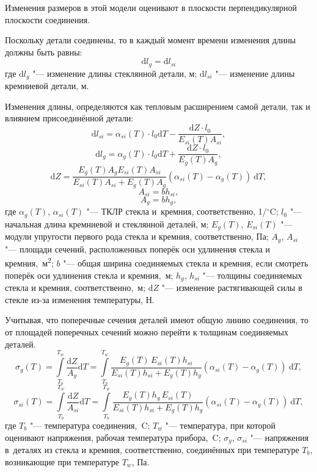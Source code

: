 Изменения размеров в этой модели оценивают в плоскости перпендикулярной плоскости
соединения.

Поскольку детали соединены, то в каждый момент времени изменения длины должны быть равны:
\begin{equation*}
    \mathrm{d}l_g=\mathrm{d}l_{si}
\end{equation*}
где  $ \mathrm{d}l_g $ "--- изменение длины стеклянной детали, м;
$ \mathrm{d}l_{si} $ "--- изменение длины кремниевой детали, м.

Изменения длины, определяются как тепловым расширением самой детали, так и влиянием присоединённой детали:
\[
    \mathrm{d}l_{si}
    =
    \alpha_{si}(T) \cdot l_0 \mathrm{d}T
    -
    \frac{\mathrm{d}Z \cdot l_0}{E_{si} (T) A_{si}},
\]
\[
    \mathrm{d}l_g
    =
    \alpha_g(T) \cdot l_0\mathrm{d}T
    +
    \frac{\mathrm{d}Z \cdot l_0}{E_g (T) A_g},
\]
\[
    \mathrm{d}Z
    =
    \frac{E_g(T) A_g E_{si}(T) A_{si}}{E_{si}(T) A_{si} + E_g(T) A_g}
    (
        \alpha_{si}(T) - \alpha_g(T)
    )
    \:\mathrm{d}T,
\]
\[
    A_{si}
    =
    b h_{si},
\]
\[
    A_g
    =
    b h_g,
\]
где
$\alpha_g(T)$,  $\alpha_{si}(T)$ "--- ТКЛР стекла и~кремния, соответственно, 1/${}^\circ$C;
$l_0$ "--- начальная длина кремниевой и стеклянной деталей, м;
$E_g(T)$,  $E_{si}(T)$ "--- модули упругости первого рода стекла и кремния, соответственно, Па;
$A_g$,  $A_{si}$ "--- площади сечений, расположенных поперёк оси удлинения стекла и кремния,~м\textsuperscript{2};
$b$ "--- общая ширина соединяемых стекла и кремния, если смотреть поперёк оси удлинения стекла и кремния,~м;
$h_g$,  $h_{si}$ "--- толщины соединяемых стекла и кремния, соответственно,~м;
$\mathrm{d}Z$ "--- изменение растягивающей силы в стекле из-за изменения температуры, Н.

Учитывая, что поперечные сечения деталей имеют общую линию соединения, то от площадей поперечных сечений можно перейти к толщинам соединяемых деталей.
\begin{equation}
    \label{eq:sigma_g}
    \sigma_g(T)
    =
    \int\limits_{T_b}^{T_w}
    \frac{\mathrm{d}Z}{A_g}
    \mathrm{d}T
    =
    \int\limits_{T_b}^{T_w}
    \frac{E_g(T)\, E_{si}(T) h_{si}}{E_{si}(T) h_{si} + E_g(T) h_g}
    (
        \alpha_{si}(T) - \alpha_g(T)
    )
    \:\mathrm{d}T,
\end{equation}
\begin{equation}
    \label{eq:sigma_si}
    \sigma_{si}(T)
    =
    \int\limits_{T_b}^{T_w}
    \frac{\mathrm{d}Z}{A_{si}}
    \mathrm{d}T
    =
    \int\limits_{T_b}^{T_w}
    \frac{E_g(T) h_{g}\, E_{si}(T)}{E_{si}(T) h_{si} + E_g(T) h_g}
    (
        \alpha_{si}(T) - \alpha_g(T)
    )
    \:\mathrm{d}T,
\end{equation}
где  $T_b$ "--- температура соединения,~{\textdegree}C;  $T_w$ "--- температура, при которой оценивают напряжения, рабочая температура прибора,~{\textdegree}C;
$\sigma_g$,  $\sigma_{si}$ "--- напряжения в~деталях из стекла и кремния, соответственно, соединённых при температуре  $T_b$, возникающие при температуре  $T_w$, Па.

